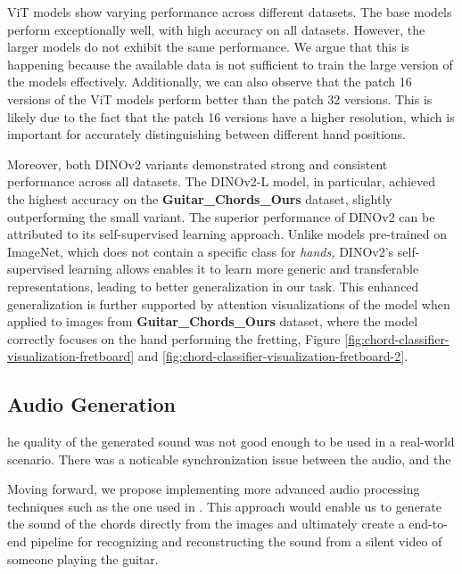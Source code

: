 \documentclass[10pt,twocolumn,letterpaper]{article}
\begin{document}
ViT models show varying performance across different datasets. The base models perform exceptionally well, with high accuracy on all datasets. However, the larger models do not exhibit the same performance. We argue that this is happening because the available data is not sufficient to train the large version of the models effectively. Additionally, we can also observe that the patch 16 versions of the ViT models perform better than the patch 32 versions. This is likely due to the fact that the patch 16 versions have a higher resolution, which is important for accurately distinguishing between different hand positions.

Moreover, both DINOv2 variants demonstrated strong and consistent performance across all datasets. The DINOv2-L model, in particular, achieved the highest accuracy on the \textbf{Guitar\_Chords\_Ours} dataset, slightly outperforming the small variant. The superior performance of DINOv2 can be attributed to its self-supervised learning approach. Unlike models pre-trained on ImageNet, which does not contain a specific class for \emph{hands,} DINOv2's self-supervised learning allows enables it to learn more generic and transferable representations, leading to better generalization in our task. This enhanced generalization is further supported by attention visualizations of the model when applied to images from \textbf{Guitar\_Chords\_Ours} dataset, where the model correctly focuses on the hand performing the fretting, Figure \ref{fig:chord-classifier-visualization-fretboard} and \ref{fig:chord-classifier-visualization-fretboard-2}. 

\subsection{Audio Generation}



he quality of the generated sound was not good enough to be used in a real-world scenario. There was a noticable synchronization issue between the audio, and the 

Moving forward, we propose implementing more advanced audio processing techniques such as the one used in \cite{su2020audeo}. This approach would enable us to generate the sound of the chords directly from the images and ultimately create a end-to-end pipeline for recognizing and reconstructing the sound from a silent video of someone playing the guitar.
\end{document}
